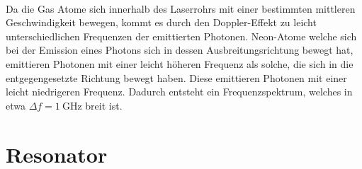 \\Da die Gas Atome sich innerhalb des Laserrohrs mit einer bestimmten mittleren Geschwindigkeit bewegen, kommt es durch den Doppler-Effekt zu leicht unterschiedlichen
Frequenzen der emittierten Photonen. Neon-Atome welche sich bei der Emission eines Photons sich in dessen Ausbreitungsrichtung bewegt hat, emittieren Photonen mit einer
leicht höheren Frequenz als solche, die sich in die entgegengesetzte Richtung bewegt haben. Diese emittieren Photonen mit einer leicht niedrigeren Frequenz. Dadurch entsteht
ein Frequenzspektrum, welches in etwa $\Delta f = \qty{1}{\giga\hertz}$\cite{Wikipedia_HeNe} breit ist.

\section{Resonator}

